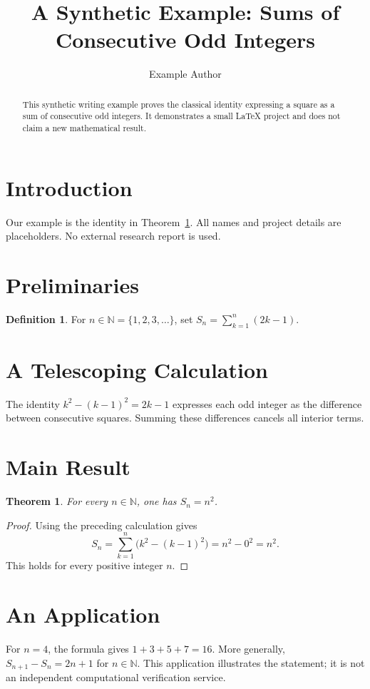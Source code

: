 \documentclass[11pt]{article}
\title{A Synthetic Example: Sums of Consecutive Odd Integers}
\author{Example Author}
\date{}
\newcommand{\NN}{\mathbb{N}}
\newtheorem{theorem}{Theorem}[section]
\theoremstyle{definition}
\newtheorem{definition}{Definition}[section]
\begin{document}
\maketitle
\begin{abstract}
This synthetic writing example proves the classical identity expressing a square
as a sum of consecutive odd integers. It demonstrates a small LaTeX project and
does not claim a new mathematical result.
\end{abstract}
\tableofcontents
\section{Introduction}
Our example is the identity in Theorem~\ref{thm:odd}. All names and project
details are placeholders. No external research report is used.
\section{Preliminaries}
\begin{definition}
For $n\in\NN=\{1,2,3,\ldots\}$, set $S_n=\sum_{k=1}^{n}(2k-1)$.
\end{definition}
\section{A Telescoping Calculation}
The identity $k^2-(k-1)^2=2k-1$ expresses each odd integer as the difference
between consecutive squares. Summing these differences cancels all interior
terms.
\section{Main Result}
\begin{theorem}\label{thm:odd}
For every $n\in\NN$, one has $S_n=n^2$.
\end{theorem}
\begin{proof}
Using the preceding calculation gives
\[
 S_n=\sum_{k=1}^{n}\bigl(k^2-(k-1)^2\bigr)=n^2-0^2=n^2.
\]
This holds for every positive integer $n$.
\end{proof}
\section{An Application}
For $n=4$, the formula gives $1+3+5+7=16$. More generally,
$S_{n+1}-S_n=2n+1$ for $n\in\NN$. This application illustrates the statement;
it is not an independent computational verification service.
\end{document}
